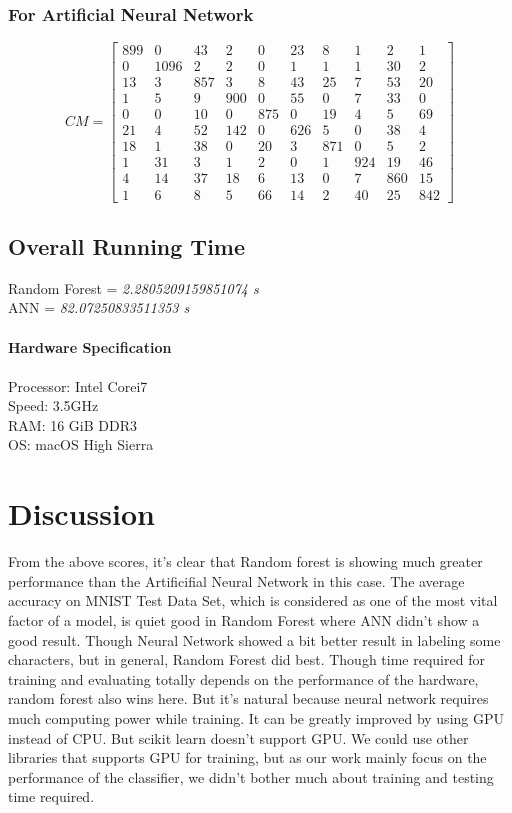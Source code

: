 \documentclass[12pt,a4paper]{article}
\begin{document}
\subsubsection{For Artificial Neural Network}
\[
CM=
  \begin{bmatrix}
899  &  0  & 43  &  2  &  0 &  23  &  8  &  1  &  2  &  1\\
0 & 1096  &  2 &   2  &  0  &  1 &   1  &  1 &  30  &  2\\
13  &  3 & 857  &  3  &  8  & 43  & 25 &   7 &  53 &  20\\
1 &   5  &  9 & 900  &  0  & 55  &  0 &   7 &  33 &   0\\
0  &  0 &  10 &   0 & 875  &  0  & 19  &  4 &   5 &  69\\
21  &  4  & 52 & 142  &  0 & 626  &  5 &   0  & 38 &   4\\
18 &   1  & 38 &   0 &  20  &  3 & 871  &  0 &   5   & 2\\
1 &  31 &   3  &  1 &   2 &   0  &  1 & 924 &  19 &  46\\
4 &  14 &  37 &  18  &  6 &  13  &  0  &  7 & 860 &  15\\
1  &  6 &   8  &  5  &  66 &  14 &   2 &  40 &  25 & 842
  \end{bmatrix}
\]
\subsection{Overall Running Time}
Random Forest = \textit{2.2805209159851074 s}\\
ANN = \textit{82.07250833511353 s}\\\\
\textbf{Hardware Specification}\\\\
Processor: Intel Corei7\\
Speed: 3.5GHz\\
RAM: 16 GiB DDR3\\
OS: macOS High Sierra


\section{Discussion}
From the above scores, it's clear that Random forest is showing much greater performance than the Artificifial Neural Network in this case. The average accuracy on MNIST Test Data Set, which is considered as one of the most vital factor of a model, is quiet good in Random Forest where ANN didn't show a good result. Though Neural Network showed a bit better result in labeling some characters, but in general, Random Forest did best. Though time required for training and evaluating totally depends on the performance of the hardware, random forest also wins here. But it's natural because neural network requires much computing power while training. It can be greatly improved by using GPU instead of CPU.\cite{erickson2017toolkits} But scikit learn doesn't support GPU. We could use other libraries that supports GPU for training, but as our work mainly focus on the performance of the classifier, we didn't bother much about training and testing time required.
\end{document}
